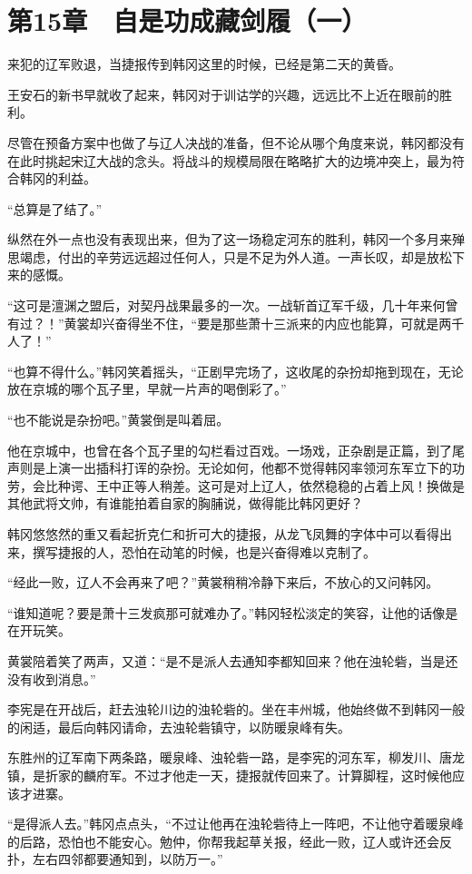 \section{第15章　自是功成藏剑履（一）}

来犯的辽军败退，当捷报传到韩冈这里的时候，已经是第二天的黄昏。

王安石的新书早就收了起来，韩冈对于训诂学的兴趣，远远比不上近在眼前的胜利。

尽管在预备方案中也做了与辽人决战的准备，但不论从哪个角度来说，韩冈都没有在此时挑起宋辽大战的念头。将战斗的规模局限在略略扩大的边境冲突上，最为符合韩冈的利益。

“总算是了结了。”

纵然在外一点也没有表现出来，但为了这一场稳定河东的胜利，韩冈一个多月来殚思竭虑，付出的辛劳远远超过任何人，只是不足为外人道。一声长叹，却是放松下来的感慨。

“这可是澶渊之盟后，对契丹战果最多的一次。一战斩首辽军千级，几十年来何曾有过？！”黄裳却兴奋得坐不住，“要是那些萧十三派来的内应也能算，可就是两千人了！”

“也算不得什么。”韩冈笑着摇头，“正剧早完场了，这收尾的杂扮却拖到现在，无论放在京城的哪个瓦子里，早就一片声的喝倒彩了。”

“也不能说是杂扮吧。”黄裳倒是叫着屈。

他在京城中，也曾在各个瓦子里的勾栏看过百戏。一场戏，正杂剧是正篇，到了尾声则是上演一出插科打诨的杂扮。无论如何，他都不觉得韩冈率领河东军立下的功劳，会比种谔、王中正等人稍差。这可是对上辽人，依然稳稳的占着上风！换做是其他武将文帅，有谁能拍着自家的胸脯说，做得能比韩冈更好？

韩冈悠悠然的重又看起折克仁和折可大的捷报，从龙飞凤舞的字体中可以看得出来，撰写捷报的人，恐怕在动笔的时候，也是兴奋得难以克制了。

“经此一败，辽人不会再来了吧？”黄裳稍稍冷静下来后，不放心的又问韩冈。

“谁知道呢？要是萧十三发疯那可就难办了。”韩冈轻松淡定的笑容，让他的话像是在开玩笑。

黄裳陪着笑了两声，又道：“是不是派人去通知李都知回来？他在浊轮砦，当是还没有收到消息。”

李宪是在开战后，赶去浊轮川边的浊轮砦的。坐在丰州城，他始终做不到韩冈一般的闲适，最后向韩冈请命，去浊轮砦镇守，以防暖泉峰有失。

东胜州的辽军南下两条路，暖泉峰、浊轮砦一路，是李宪的河东军，柳发川、唐龙镇，是折家的麟府军。不过才他走一天，捷报就传回来了。计算脚程，这时候他应该才进寨。

“是得派人去。”韩冈点点头，“不过让他再在浊轮砦待上一阵吧，不让他守着暖泉峰的后路，恐怕也不能安心。勉仲，你帮我起草关报，经此一败，辽人或许还会反扑，左右四邻都要通知到，以防万一。”

